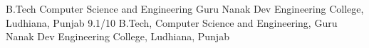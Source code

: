     {B.Tech}
    {Computer Science and Engineering}
    {Guru Nanak Dev Engineering College, Ludhiana, Punjab}
    {9.1/10}
    {}
    {B.Tech, }
    {Computer Science and Engineering, }
    {Guru Nanak Dev Engineering College, Ludhiana, Punjab}
    {}
    {}

